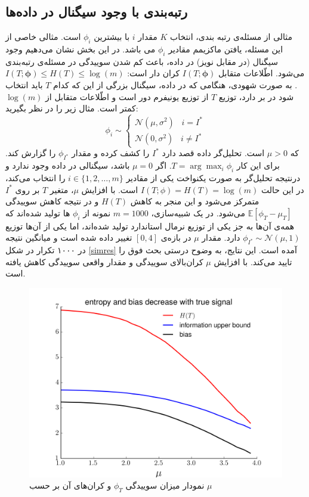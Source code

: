 \documentclass[a4paper,12pt]{article}
\newcommand{\E}{\mathbb{E}}
\newcommand{\bfphi}{\bm {\phi}}
\begin{document}
	
	
	
	\subsection{رتبه‌بندی با وجود سیگنال در داده‌ها}
	مثالی از مسئله‌ی رتبه بندی، انتخاب $K$ مقدار $i$ با بیشترین
	$\phi_i$
	است. مثالی خاصی از این مسئله، یافتن ماکزیمم مقادیر 
	$\phi_i$
	می باشد. در این بخش نشان می‌دهیم وجود سیگنال (در مقابل نویز) در داده، باعث کم شدن سوییدگی در مسئله‌ی رتبه‌بندی می‌شود. اطّلاعات متقابل 
	$I(T; \bfphi)$
	کران دار است:
	$I(T; \bfphi) \leq H(T) \leq \log(m)$. 
	به صورت شهودی، هنگامی که در داده، سیگنال بزرگی از این که کدام 
	$T$
	باید انتخاب شود در بر دارد، توزیع 
	$T$
	از توزیع یونیفرم دور است و اطّلاعات متقابل از 
	$\log(m)$
	کمتر است. مثال زیر را در نظر بگیرید:
	\begin{equation}
	\phi_i \sim
	\begin{cases}
	\mathcal{N}(\mu, \sigma^2)\;\;\; i = I^*\\
	\mathcal{N}(0, \sigma^2)\;\;\; i \neq I^*
	\end{cases}
	\end{equation}
	که 
	$\mu > 0$
	است. تحلیل‌گر داده قصد دارد 
	$I^*$
	را کشف کرده و مقدار 
	$\phi_{I^*}$
	را گزارش کند. برای این کار 
	$T = \arg\max_i \phi_i$.
	اگر 
	$\mu = 0$
	باشد، سیگنالی در داده وجود ندارد و درنتیجه  تحلیل‌گر به صورت یکنواخت یکی از مقادیر 
	$i \in \{1, 2, \dots, m\}$
	را انتخاب می‌کند، در این حالت 
	$I(T; \phi) = H(T) = \log(m)$ 
	است. با افزایش 
	$\mu$،
	متغیر 
	$T$
	بر روی 
	$I^*$
	متمرکز می‌شود و این منجر به کاهش 
	$H(T)$
	و در نتیجه کاهش  سوییدگی
	$\E[\phi_T - \mu_T]$
	می‌شود. در یک شبیه‌سازی، 
	$m = 1000$
	نمونه از 
	$\phi_i$
	ها تولید شده‌اند که همه‌ی آن‌ها به جز یکی از توزیع نرمال استاندارد تولید شده‌اند، اما یکی از آن‌ها توزیع
	$\phi_{I^*} \sim \mathcal{N}(\mu, 1)$
	دارد. مقدار 
	$\mu$
	در بازه‌ی 
	$[0, 4]$
	تغییر داده شده است و میانگین نتیجه در ۱۰۰۰ تکرار در شکل
	\eqref{simres}
	آمده است. این نتایج، به وضوح درستی بحث فوق را تایید می‌کند. با افزایش 
	$\mu$
	کران‌بالای سوییدگی و مقدار واقعی سوییدگی کاهش یافته است.
	
	\begin{figure}[h!]
		\centering
		\includegraphics[scale=0.5]{fig_1.png}
		\caption{نمودار میزان سوییدگی 
			$\phi_T$	 
			و کران‌های آن  بر حسب 
			$\mu$}
		\label{simres}
	\end{figure}
	
\end{document}
